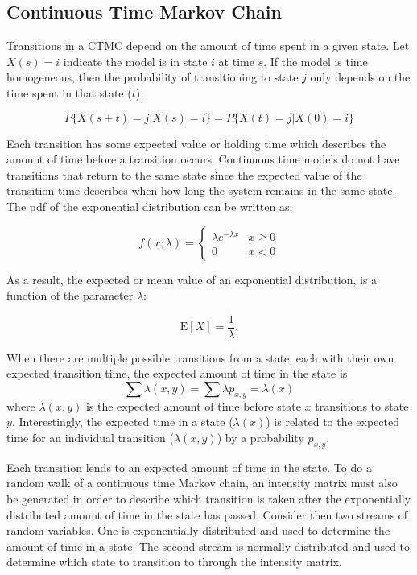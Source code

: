 \subsection{Continuous Time Markov Chain}

Transitions in a \ac{CTMC} depend on the amount of time spent in a given state.
Let $X(s) = i$ indicate the model is in state $i$ at time $s$.
If the model is time homogeneous, then the probability of transitioning to state $j$ only depends on the time spent in that state ($t$).

\begin{equation}
P\{ X(s+t)=j | X(s) = i \} = P\{ X(t)=j | X(0) = i \}
\end{equation}

Each transition has some expected value or holding time which describes the amount of time before a transition occurs.
Continuous time models do not have transitions that return to the same state since the expected value of the transition time describes when how long the system  remains in the same state.
The \ac{pdf} of the exponential distribution can be written as: \cite{MARKOV1}

\begin{equation}
f(x;\lambda) = \begin{cases}
\lambda e^{-\lambda x} & x \ge 0 \\
0 & x < 0
\end{cases}
\end{equation}

As a result, the expected or mean value of an exponential distribution, is a function of
the parameter $\lambda$: \cite{MARKOV1}

\begin{equation}
\mathrm{E}[X] = \frac{1}{\lambda}. \!
\end{equation}

When there are multiple possible transitions from a state, each with their own expected transition time, the expected amount of time in the state is \cite{MARKOV2}
\begin{equation}
\sum \lambda(x,y) = \sum \lambda p_{x,y} = \lambda(x)
\end{equation}
where $\lambda(x,y)$ is the expected amount of time before state $x$ transitions to state $y$.
Interestingly, the expected time in a state ($\lambda(x)$) is related to the expected time for an individual transition ($\lambda(x,y)$) by a probability $p_{x,y}$.

Each transition lends to an expected amount of time in the state.
To do a random walk of a continuous time Markov chain, an intensity matrix must also be generated in order to describe which transition is taken after the exponentially distributed amount of time in the state has passed.
Consider then two streams of random variables.
One is exponentially distributed and used to determine the amount of time in a state.
The second stream is normally distributed and used to determine which state to transition to through the intensity matrix.

